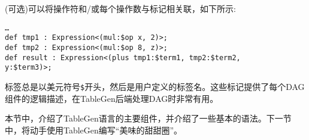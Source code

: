(可选)可以将操作符和/或每个操作数与标记相关联，如下所示:

\begin{lstlisting}[style=styleCXX]
…
def tmp1 : Expression<(mul:$op x, 2)>;
def tmp2 : Expression<(mul:$op 8, z)>;
def result : Expression<(plus tmp1:$term1, tmp2:$term2,
y:$term3)>;
\end{lstlisting}

标签总是以美元符号\texttt{\$}开头，然后是用户定义的标签名。这些标记提供了每个DAG组件的逻辑描述，在TableGen后端处理DAG时非常有用。

本节中，介绍了TableGen语言的主要组件，并介绍了一些基本的语法。下一节中，将动手使用TableGen编写“美味的甜甜圈”。

















